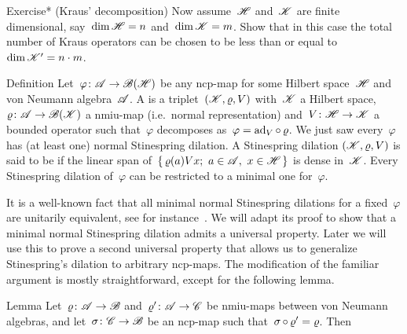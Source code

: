 \documentclass[b]{subfiles}
\begin{document}
\begin{parsec}
\begin{point}{Exercise* (Kraus' decomposition)}
Now assume~$\mathscr{H}$ and~$\mathscr{K}$ are finite dimensional,
    say~$\dim \mathscr{H} = n$ and~$\dim \mathscr{K} = m$.
Show that in this case
    the total number of Kraus operators can be chosen
    to be less than or equal to~$\dim \mathscr{K}' = n \cdot m$.
\end{point}
\end{parsec}

\begin{parsec}%
\begin{point}{Definition}%
Let~$\varphi\colon \mathscr{A} \to \mathscr{B}(\mathscr{H})$
    be any ncp-map
    for some Hilbert space~$\mathscr{H}$ and von Neumann algebra~$\mathscr{A}$.
    A 
    is a triplet~$(\mathscr{K},\varrho, V)$
    with~$\mathscr{K}$ a Hilbert space,
    $\varrho\colon \mathscr{A} \to \mathscr{B}(\mathscr{K})$ a nmiu-map
        (i.e.~normal representation)
        and~$V\colon \mathscr{H} \to \mathscr{K}$ a bounded operator
        such that~$\varphi$ decomposes as~$\varphi = \mathrm{ad}_V \mathop{\circ} \varrho$.
    We just saw every~$\varphi$ has (at least one)
        normal Stinespring dilation.
A Stinespring dilation
$(\mathscr{K},\varrho,V)$ is said to be 
if the linear span of~$\{ \,\varrho(a) Vx; \ a \in \mathscr{A},\ x\in \mathscr{H}\,\}$
is dense in~$\mathscr{K}$.
Every Stinespring dilation of~$\varphi$ can be restricted to a minimal one
    for~$\varphi$.
\end{point}
\begin{point}%
It is a well-known fact that all minimal normal Stinespring dilations
    for a fixed~$\varphi$ are unitarily equivalent,
    see for instance~\cite[Proposition 4.2]{paulsen}.
We will adapt its proof to show that a minimal normal Stinespring
    dilation admits a universal property.
Later we will use this to prove a second universal property 
    that allows us to generalize Stinespring's dilation to
    arbitrary ncp-maps.
The modification of the familiar argument
    is mostly straightforward, except for the following lemma.
\end{point}
\begin{point}{Lemma}%
Let~$\varrho\colon \mathscr{A} \to \mathscr{B}$ and~$\varrho'\colon \mathscr{A} \to \mathscr{C}$
    be nmiu-maps between von Neumann algebras,
        and let~$\sigma \colon \mathscr{C} \to \mathscr{B}$ be an ncp-map
        such that~$\sigma \mathop{\circ} \varrho' = \varrho$. Then
\begin{equation*}

\end{equation*}
\end{point}
\end{parsec}
\end{document}
